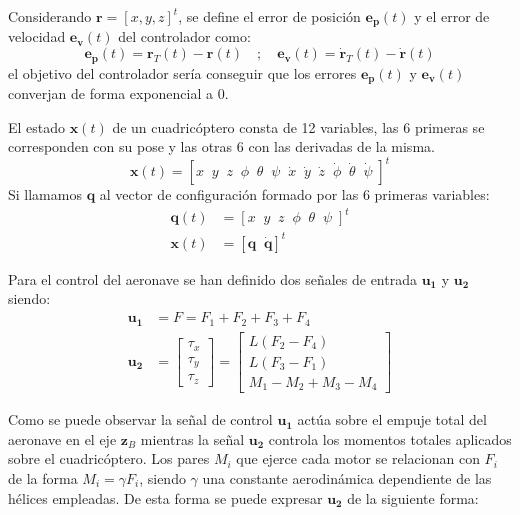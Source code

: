 Considerando $\mathbf{r} = [x,y,z]^t$, se define el error de posición $\mathbf{e_p}(t)$ y el error de velocidad $\mathbf{e_v}(t)$ del controlador como:
\begin{equation}
	\mathbf{e_p}(t) = \mathbf{r}_{T}(t) - \mathbf{r}(t) \quad;\quad 
\mathbf{e_v}(t) = \mathbf{\dot r}_{T}(t) - \mathbf{\dot r}(t)
\end{equation}
el objetivo del controlador sería conseguir que los errores $\mathbf{e_p}(t)$ y $\mathbf{e_v}(t)$ converjan de forma exponencial a 0.


El estado $\mathbf{x}(t)$ de un cuadricóptero consta de 12 variables, las 6 primeras se corresponden con su pose y las otras 6 con las derivadas de la misma.
\begin{equation}
\mathbf{x}(t) = \left[
	x  \;\;
	y  \;\;
	z  \;\;
	\phi  \;\;
	\theta  \;\;
	\psi  \;\;
	\dot{x}  \;\;
	\dot{y}  \;\;
	\dot{z}  \;\;
	\dot{\phi}  \;\;
	\dot{\theta}  \;\;
	\dot{\psi}\;\right]^t
\end{equation}
Si llamamos $\mathbf{q}$ al vector de configuración formado por las 6 primeras variables:
\begin{align}
	\mathbf{q}(t) &= \left[
	x  \;\;
	y  \;\;
	z  \;\;
	\phi  \;\;
	\theta  \;\;
	\psi  \;\right]^t\\
	\mathbf{x}(t) &= \left[\mathbf{q} \;\; \mathbf{\dot{q}}\right]^t
\end{align}

Para el control del aeronave se han definido dos señales de entrada $\mathbf{u_1}$ y $\mathbf{u_2}$ siendo:
\begin{align}
	\mathbf{u_1}  &= F =  F_1 +F_2 +F_3 +F_4  \label{eq:u1}\\
	\mathbf{u_2}  &= \begin{bmatrix} \tau_x\\ 
		\tau_y\\
		\tau_z
	\end{bmatrix} =\begin{bmatrix}
	L (F_2-F_4)\\
	L (F_3-F_1)\\
	M_1 - M_2 + M_3 - M_4
\end{bmatrix}
\end{align} 

Como se puede observar la señal de control $\mathbf{u_1}$ actúa sobre el empuje total del aeronave en el eje $\mathbf{z}_B$ mientras la señal $\mathbf{u_2}$ controla los momentos totales aplicados sobre el cuadricóptero. Los pares $M_i$ que ejerce cada motor se relacionan con $F_i$ de la forma $M_i = \gamma F_i$, siendo $\gamma$ una constante aerodinámica dependiente de las hélices empleadas. De esta forma se puede expresar $\mathbf{u_2}$ de la siguiente forma:

